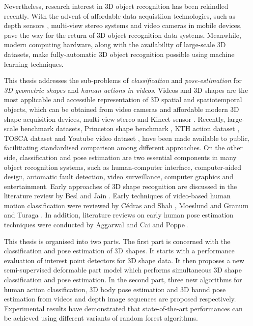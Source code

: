 Nevertheless, research interest in 3D object recognition has been rekindled recently. 
With the advent of affordable data acquistiion technologies, such as depth sensors \cite{Shotton2011}, multi-view stereo systems \cite{Vogiatzis2011} and video cameras in mobile devices, pave the way for the return of 3D object recognition data systems. 
Meanwhile, modern computing hardware, along with the availability of large-scale 3D datasets, make fully-automatic 3D object recognition possible using machine learning techniques.  

This thesis addresses the sub-problems of \emph{classification} and \emph{pose-estimation} for \emph{3D geometric shapes} and \emph{human actions in videos}. 
Videos and 3D shapes are the most applicable and accessible representation of 3D spatial and spatiotemporal objects, which can be obtained from video cameras and affordable modern 3D shape acquisition devices, \eg multi-view stereo \cite{Vogiatzis2011} and Kinect sensor \cite{Shotton2011}. 
Recently, large-scale benchmark datasets, \eg Princeton shape benchmark \cite{Shilane2004},  KTH action dataset \cite{Schuldt2004}, TOSCA dataset \cite{Bronstein2011} and Youtube video dataset \cite{Liu2009}, have been made available to public, facilitiating standardised comparison among different approaches. 
On the other side, classification and pose estimation are two essential components in many object recognition systems, such as human-computer interface, computer-aided design, automatic fault detection, video surveillance, computer graphics and entertainment. 
Early approaches of 3D shape recognition are discussed in the literature review by Besl and Jain \cite{Besl1985}. Early techniques of video-based human motion classification were reviewed by C\'edras and Shah \cite{Cedras1995}, Moeslund and Granum \cite{Moeslund2001} and Turaga \etal \cite{Turaga2008}. In addition, literature reviews on early human pose estimation techniques were conducted by Aggarwal and Cai \cite{Aggarwal1999} and Poppe \cite{Poppe2007}.  

This thesis is organised into two parts.  
The first part is concerned with the classification and pose estimation of 3D shapes. It starts with a performance evaluation of interest point detectors for 3D shape data. It then proposes a new semi-supervised deformable part model which performs simultaneous 3D shape classification and pose estimation. In the second part, three new algorithms for human action classification, 3D body pose estimation and 3D hannd pose estimation from videos and depth image sequences are proposed respectively. Experimental results have demonstrated that state-of-the-art performances can be achieved using different variants of random forest algorithms.  

